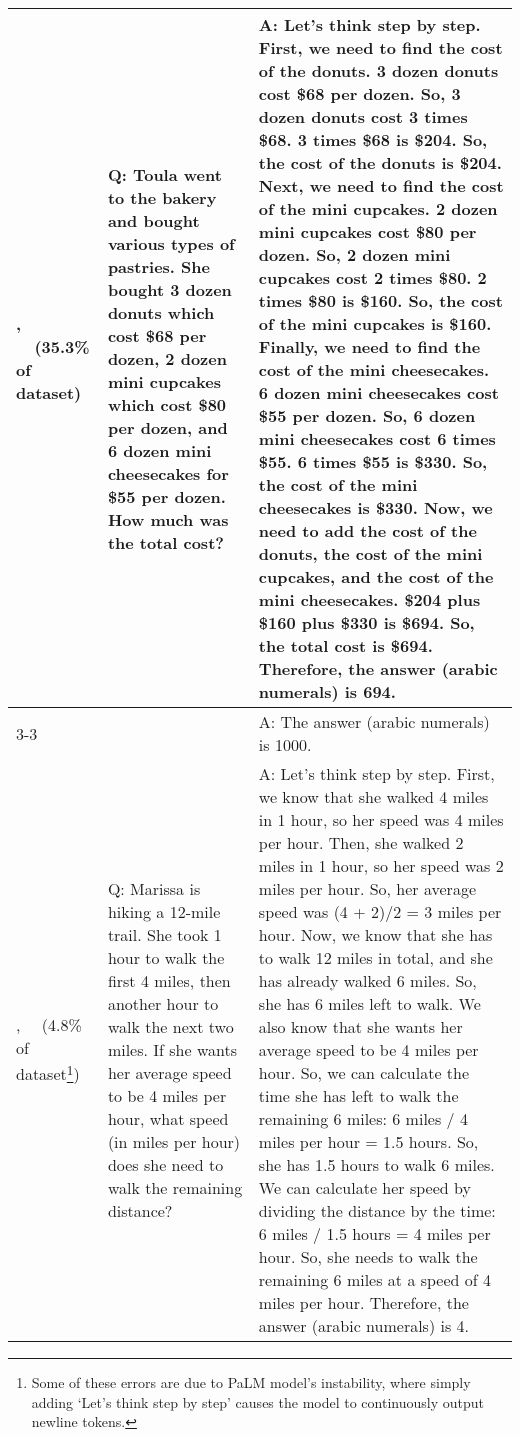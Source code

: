 \begin{center}
\begin{longtable}{|p{}|p{}|p{}|}
\ours\okmark, \theirsz~\ngmark~(35.3\% of dataset) & Q: Toula went to the bakery and bought various types of pastries. She bought 3 dozen donuts which cost \$68 per dozen, 2 dozen mini cupcakes which cost \$80 per dozen, and 6 dozen mini cheesecakes for \$55 per dozen. How much was the total cost?
&A: Let's think step by step. First, we need to find the cost of the donuts. 3 dozen donuts cost \$68 per dozen. So, 3 dozen donuts cost 3 times \$68. 3 times \$68 is \$204. So, the cost of the donuts is \$204. Next, we need to find the cost of the mini cupcakes. 2 dozen mini cupcakes cost \$80 per dozen. So, 2 dozen mini cupcakes cost 2 times \$80. 2 times \$80 is \$160. So, the cost of the mini cupcakes is \$160. Finally, we need to find the cost of the mini cheesecakes. 6 dozen mini cheesecakes cost \$55 per dozen. So, 6 dozen mini cheesecakes cost 6 times \$55. 6 times \$55 is \$330. So, the cost of the mini cheesecakes is \$330. Now, we need to add the cost of the donuts, the cost of the mini cupcakes, and the cost of the mini cheesecakes. \$204 plus \$160 plus \$330 is \$694. So, the total cost is \$694. Therefore, the answer (arabic numerals) is 694. \okmark \\

\cmidrule(r){3-3}

& & A: The answer (arabic numerals) is 1000. \ngmark \myspace \bblue{(GT : 694)} \\

\midrule

 \ours\ngmark, \theirsz~\okmark~(4.8\% of dataset\footnote{Some of these errors are due to PaLM model's instability, where simply adding `Let's think step by step' causes the model to continuously output newline tokens.}) & Q: Marissa is hiking a 12-mile trail. She took 1 hour to walk the first 4 miles, then another hour to walk the next two miles. If she wants her average speed to be 4 miles per hour, what speed (in miles per hour) does she need to walk the remaining distance? & A: Let's think step by step. First, we know that she walked 4 miles in 1 hour, so her speed was 4 miles per hour. Then, she walked 2 miles in 1 hour, so her speed was 2 miles per hour. So, her average speed was (4 + 2)/2 = 3 miles per hour. Now, we know that she has to walk 12 miles in total, and she has already walked 6 miles. So, she has 6 miles left to walk. We also know that she wants her average speed to be 4 miles per hour. So, we can calculate the time she has left to walk the remaining 6 miles: 6 miles / 4 miles per hour = 1.5 hours. So, she has 1.5 hours to walk 6 miles. We can calculate her speed by dividing the distance by the time: 6 miles / 1.5 hours = 4 miles per hour. So, she needs to walk the remaining 6 miles at a speed of 4 miles per hour. Therefore, the answer (arabic numerals) is 4. \ngmark \myspace \bblue{(GT : 6)} \\


\end{longtable}
\end{center}
